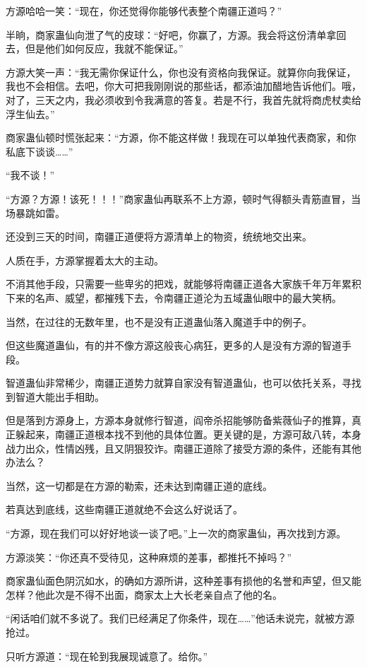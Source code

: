 \begin{this_body}
方源哈哈一笑：“现在，你还觉得你能够代表整个南疆正道吗？”

半晌，商家蛊仙向泄了气的皮球：“好吧，你赢了，方源。我会将这份清单拿回去，但是他们如何反应，我就不能保证。”

方源大笑一声：“我无需你保证什么，你也没有资格向我保证。就算你向我保证，我也不会相信。去吧，你大可把我刚刚说的那些话，都添油加醋地告诉他们。哦，对了，三天之内，我必须收到令我满意的答复。若是不行，我首先就将商虎杖卖给浮生仙去。”

商家蛊仙顿时慌张起来：“方源，你不能这样做！我现在可以单独代表商家，和你私底下谈谈……”

“我不谈！”

“方源？方源！该死！！！”商家蛊仙再联系不上方源，顿时气得额头青筋直冒，当场暴跳如雷。

还没到三天的时间，南疆正道便将方源清单上的物资，统统地交出来。

人质在手，方源掌握着太大的主动。

不消其他手段，只需要一些卑劣的把戏，就能够将南疆正道各大家族千年万年累积下来的名声、威望，都摧残下去，令南疆正道沦为五域蛊仙眼中的最大笑柄。

当然，在过往的无数年里，也不是没有正道蛊仙落入魔道手中的例子。

但这些魔道蛊仙，有的并不像方源这般丧心病狂，更多的人是没有方源的智道手段。

智道蛊仙非常稀少，南疆正道势力就算自家没有智道蛊仙，也可以依托关系，寻找到智道大能出手相助。

但是落到方源身上，方源本身就修行智道，阎帝杀招能够防备紫薇仙子的推算，真正躲起来，南疆正道根本找不到他的具体位置。更关键的是，方源可敌八转，本身战力出众，性情凶残，且又阴狠狡诈。南疆正道除了接受方源的条件，还能有其他办法么？

当然，这一切都是在方源的勒索，还未达到南疆正道的底线。

若真达到底线，这些南疆正道就绝不会这么好说话了。

“方源，现在我们可以好好地谈一谈了吧。”上一次的商家蛊仙，再次找到方源。

方源淡笑：“你还真不受待见，这种麻烦的差事，都推托不掉吗？”

商家蛊仙面色阴沉如水，的确如方源所讲，这种差事有损他的名誉和声望，但又能怎样？他此次是不得不出面，商家太上大长老亲自点了他的名。

“闲话咱们就不多说了。我们已经满足了你条件，现在……”他话未说完，就被方源抢过。

只听方源道：“现在轮到我展现诚意了。给你。”


\end{this_body}
